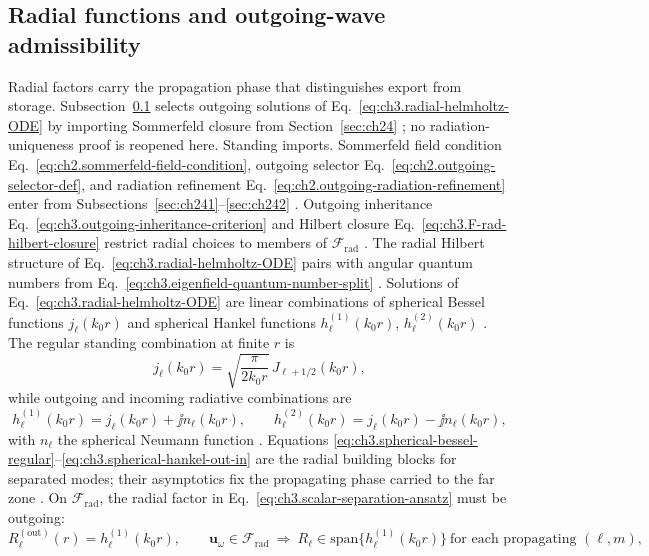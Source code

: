 \subsection{Radial functions and outgoing-wave admissibility}
\label{sec:ch333}
Radial factors carry the propagation phase that distinguishes export from storage. Subsection~\ref{sec:ch333}
selects outgoing solutions of Eq.~\eqref{eq:ch3.radial-helmholtz-ODE} by importing Sommerfeld closure from
Section~\ref{sec:ch24} \cite{stratton1941}; no radiation-uniqueness proof is
reopened here.
Standing imports. Sommerfeld field condition Eq.~\eqref{eq:ch2.sommerfeld-field-condition}, outgoing selector
Eq.~\eqref{eq:ch2.outgoing-selector-def}, and radiation refinement
Eq.~\eqref{eq:ch2.outgoing-radiation-refinement} enter from Subsections~\ref{sec:ch241}--\ref{sec:ch242}
\cite{stratton1941}. Outgoing inheritance Eq.~\eqref{eq:ch3.outgoing-inheritance-criterion}
and Hilbert closure Eq.~\eqref{eq:ch3.F-rad-hilbert-closure} restrict radial choices to members of
\(\mathcal{F}_{\mathrm{rad}}\) \cite{hansen1988}. The radial Hilbert structure of
Eq.~\eqref{eq:ch3.radial-helmholtz-ODE} pairs with angular quantum numbers from
Eq.~\eqref{eq:ch3.eigenfield-quantum-number-split} \cite{jackson1999}.
Solutions of Eq.~\eqref{eq:ch3.radial-helmholtz-ODE} are linear combinations of spherical Bessel functions
\(j_{\ell}(k_{0}r)\) and spherical Hankel functions \(h_{\ell}^{(1)}(k_{0}r)\), \(h_{\ell}^{(2)}(k_{0}r)\)
\cite{stratton1941}. The regular standing combination at finite \(r\) is
\begin{equation}
\label{eq:ch3.spherical-bessel-regular}
j_{\ell}(k_{0}r)
=
\sqrt{\frac{\pi}{2k_{0}r}}\,J_{\ell+1/2}(k_{0}r),
\end{equation}
while outgoing and incoming radiative combinations are
\begin{equation}
\label{eq:ch3.spherical-hankel-out-in}
h_{\ell}^{(1)}(k_{0}r)=j_{\ell}(k_{0}r)+\jj n_{\ell}(k_{0}r),
\qquad
h_{\ell}^{(2)}(k_{0}r)=j_{\ell}(k_{0}r)-\jj n_{\ell}(k_{0}r),
\end{equation}
with \(n_{\ell}\) the spherical Neumann function \cite{stratton1941}. Equations
\eqref{eq:ch3.spherical-bessel-regular}--\eqref{eq:ch3.spherical-hankel-out-in} are the radial building
blocks for separated modes; their asymptotics fix the propagating phase carried to the far zone
\cite{hansen1988}.
On \(\mathcal{F}_{\mathrm{rad}}\), the radial factor in Eq.~\eqref{eq:ch3.scalar-separation-ansatz} must be
outgoing:
\begin{equation}
\label{eq:ch3.outgoing-radial-admissibility}
R_{\ell}^{\mathrm{(out)}}(r)
=
h_{\ell}^{(1)}(k_{0}r),
\qquad
\mathbf{u}_{\omega}\in\mathcal{F}_{\mathrm{rad}}
\ \Longrightarrow\
R_{\ell}\in\mathrm{span}\{h_{\ell}^{(1)}(k_{0}r)\}
\ \text{for each propagating }(\ell,m),
\end{equation}
